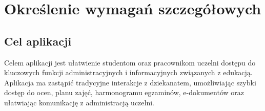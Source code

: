 \newpage
\section{Określenie wymagań szczegółowych}		%

\subsection{Cel aplikacji}
Celem aplikacji jest ułatwienie studentom oraz pracownikom uczelni dostępu do kluczowych funkcji administracyjnych i informacyjnych związanych z edukacją. Aplikacja ma zastąpić tradycyjne interakcje z dziekanatem, umożliwiając szybki dostęp do ocen, planu zajęć, harmonogramu egzaminów, e-dokumentów oraz ułatwiając komunikację z administracją uczelni.

